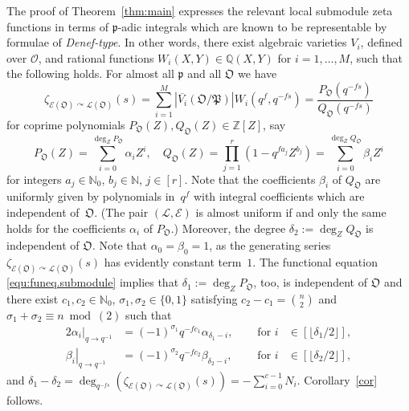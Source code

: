 \documentclass[11pt]{amsart}
\numberwithin{equation}{section}
\numberwithin{figure}{section}
\theoremstyle{plain}
\theoremstyle{definition}
\theoremstyle{remark}
\begin{document}
The proof of Theorem~\ref{thm:main} expresses the relevant local
submodule zeta functions in terms of ${\mathfrak{p}}$-adic integrals which are
known to be representable by formulae of \emph{Denef-type}. In other
words, there exist algebraic varieties $V_i$, defined over ${\ensuremath{\mathcal{O}}}$, and
rational functions $W_i(X,Y)\in{\ensuremath{\mathbb{Q}}}(X,Y)$ for $i=1,\dots,M$, such that
the following holds. For almost all ${\mathfrak{p}}$ and all ${\mathfrak O}$ we have
$$\zeta_{{\mathcal{E}}({\mathfrak O}){\curvearrowright} {\ensuremath{\mathcal{L}}}({\mathfrak O})}(s) = \sum_{i=1}^M
|\overline{V_i}({\mathfrak O}/{\mathfrak{P}})| W_i(q^f,q^{-fs})=
\frac{P_{\mathfrak O}(q^{-fs})}{Q_{\mathfrak O}(q^{-fs})}$$ for coprime polynomials
$P_{\mathfrak O}(Z), Q_{\mathfrak O}(Z)\in {\ensuremath{\mathbb{Z}}}[Z]$, say
$$P_{\mathfrak O}(Z) = \sum_{i=0}^{\deg_Z P_{\mathfrak O}}\alpha_iZ^i, \quad
Q_{\mathfrak O}(Z)=\prod_{j=1}^r(1-q^{f a_j}Z^{b_j}) = \sum_{i=0}^{\deg_Z
  Q_{\mathfrak O}}\beta_i Z^i$$ for integers $a_j\in{\ensuremath{\mathbb{N}}}_0$, $b_j\in{\ensuremath{\mathbb{N}}}$,
$j\in[r]$. Note that the coefficients $\beta_i$ of $Q_{\mathfrak O}$ are
uniformly given by polynomials in~$q^f$ with integral coefficients
which are independent of~${\mathfrak O}$. (The pair $({\ensuremath{\mathcal{L}}},{\mathcal{E}})$ is almost
uniform if and only the same holds for the coefficients $\alpha_i$ of
$P_{\mathfrak O}$.) Moreover, the degree $\delta_2 := \deg_Z Q_{\mathfrak O}$ is
independent of ${\mathfrak O}$.  Note that $\alpha_0=\beta_0=1$, as the
generating series $\zeta_{{\mathcal{E}}({\mathfrak O}){\curvearrowright} {\ensuremath{\mathcal{L}}}({\mathfrak O})}(s)$ has evidently
constant term~$1$. The functional equation \eqref{equ:funeq.submodule}
implies that $\delta_1:=\deg_Z P_{\mathfrak O}$, too, is independent of
${\mathfrak O}$ and there exist $c_1,c_2\in{\ensuremath{\mathbb{N}}}_0$, $\sigma_1,
\sigma_2\in\{0,1\}$ satisfying $c_2-c_1=\binom{n}{2}$ and $\sigma_1 +
\sigma_2 \equiv n \bmod(2)$ such that
\begin{alignat*}{2}
  \left. \alpha_i \right|_{q{\rightarrow} q^{-1}} &= (-1)^{\sigma_1}
  q^{-fc_1}\alpha_{\delta_1-i},& \quad \textrm{ for }i&\in [\lfloor
    \delta_1/ 2 \rfloor], \\ \left. \beta_i \right|_{q{\rightarrow} q^{-1}} &=
  (-1)^{\sigma_2} q^{-fc_2}\beta_{\delta_2-i},& \quad \textrm{ for
  }i&\in [\lfloor \delta_2/ 2 \rfloor], \end{alignat*} and $ \delta_1
- \delta_2 = \deg_{q^{-fs}}\left( \zeta_{{\mathcal{E}}({\mathfrak O}) {\curvearrowright}
  {\ensuremath{\mathcal{L}}}({\mathfrak O})}(s)\right) = - \sum_{i=0}^{c-1}N_i$. Corollary~\ref{cor}
follows.
\end{document}
